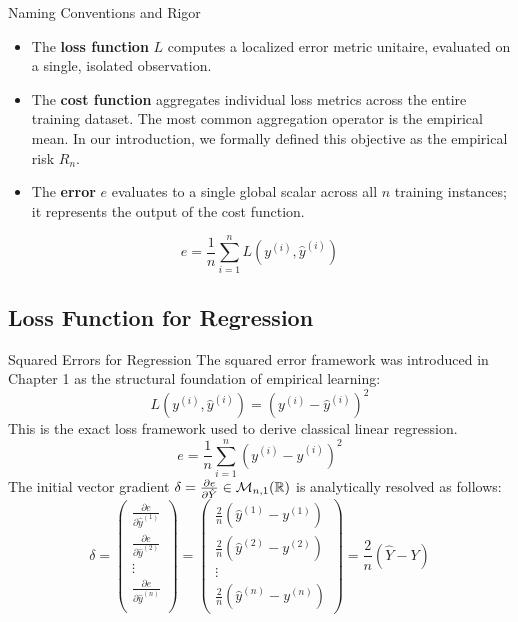 \begin{frame}{Naming Conventions and Rigor}
	\begin{itemize}
		\item The \textbf{loss function} $L$ computes a localized error metric unitaire, evaluated on a single, isolated observation.
		\item The \textbf{cost function} aggregates individual loss metrics across the entire training dataset. The most common aggregation operator is the empirical mean. In our introduction, we formally defined this objective as the empirical risk $R_n$.
		\item The \textbf{error} $e$ evaluates to a single global scalar across all $n$ training instances; it represents the output of the cost function.
	\end{itemize}
	\vspace{0.5cm}
	\begin{equation*}
		e = \frac{1}{n} \sum_{i=1}^{n} L\left(y^{(i)}, \hat{y}^{(i)}\right)
	\end{equation*}
\end{frame}

\subsection[Loss Function for Regression]{Loss Function for Regression}

\begin{frame}{Squared Errors for Regression}
	The squared error framework was introduced in Chapter 1 as the structural foundation of empirical learning:
	\begin{equation*}
		L\left(y^{(i)}, \hat{y}^{(i)}\right) = \left(y^{(i)} - \hat{y}^{(i)}\right)^2
	\end{equation*}
	This is the exact loss framework used to derive classical linear regression.
	\pause
	\begin{equation*}
		e = \frac{1}{n} \sum_{i=1}^n \left(y^{(i)} - \hat{y}^{(i)}\right)^2
	\end{equation*}
	\pause
	The initial vector gradient $\delta = \frac{\partial{e}}{\partial{\hat{Y}}} \in \mathcal{M}_{n,1}(\mathbb{R})$ is analytically resolved as follows:
	\begin{equation*}
		\delta = 
		\begin{pmatrix}
			\frac{\partial{e}}{\partial{\hat{y}^{(1)}}} \\[5pt]
			\frac{\partial{e}}{\partial{\hat{y}^{(2)}}} \\[5pt]
			\vdots \\
			\frac{\partial{e}}{\partial{\hat{y}^{(n)}}} \\
		\end{pmatrix}
		=
		\begin{pmatrix}
			\frac{2}{n} \left(\hat{y}^{(1)} - y^{(1)}\right) \\
			\frac{2}{n} \left(\hat{y}^{(2)} - y^{(2)}\right) \\
			\vdots \\
			\frac{2}{n} \left(\hat{y}^{(n)} - y^{(n)}\right)
		\end{pmatrix}
		= \frac{2}{n} \left(\hat{Y} - Y\right)
	\end{equation*}
\end{frame}

